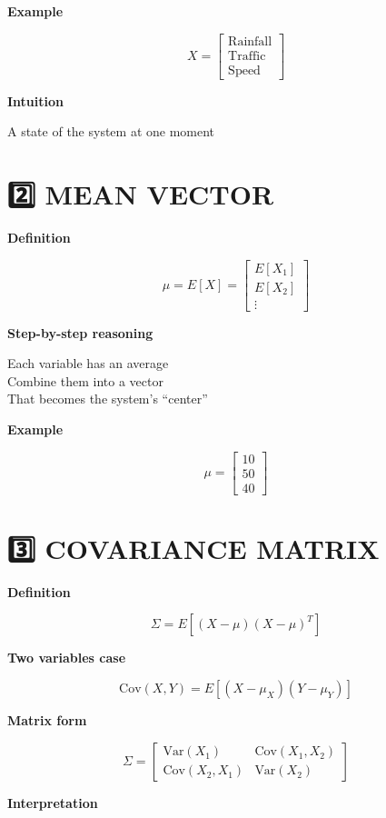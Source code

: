 \documentclass[12pt]{article}
\begin{document}
\textbf{Example}

\[
X =
\begin{bmatrix}
\text{Rainfall} \\
\text{Traffic} \\
\text{Speed}
\end{bmatrix}
\]

\textbf{Intuition}

A state of the system at one moment

\section*{2️⃣ MEAN VECTOR}

\textbf{Definition}

\[
\mu = E[X] =
\begin{bmatrix}
E[X_1] \\
E[X_2] \\
\vdots
\end{bmatrix}
\]

\textbf{Step-by-step reasoning}

Each variable has an average \\
Combine them into a vector \\
That becomes the system’s “center”

\textbf{Example}

\[
\mu =
\begin{bmatrix}
10 \\
50 \\
40
\end{bmatrix}
\]

\section*{3️⃣ COVARIANCE MATRIX}

\textbf{Definition}

\[
\Sigma = E[(X - \mu)(X - \mu)^T]
\]

\textbf{Two variables case}

\[
\text{Cov}(X,Y) = E[(X - \mu_X)(Y - \mu_Y)]
\]

\textbf{Matrix form}

\[
\Sigma =
\begin{bmatrix}
\text{Var}(X_1) & \text{Cov}(X_1, X_2) \\
\text{Cov}(X_2, X_1) & \text{Var}(X_2)
\end{bmatrix}
\]

\textbf{Interpretation}
\end{document}

